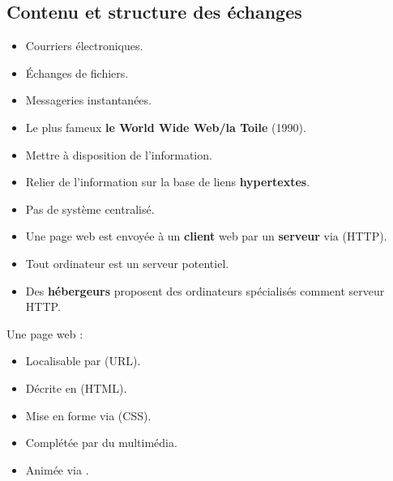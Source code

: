 \subsection{Contenu et structure des échanges} 

\begin{slide}
	\begin{itemize}
		\item Courriers électroniques.
		\item Échanges de fichiers.
		\item Messageries instantanées.
		\item Le plus fameux \textbf{le World Wide Web/la Toile} (1990).
	\end{itemize}
\end{slide}


\begin{slide}
	\begin{itemize}
		\item Mettre à disposition de l'information.
		\item Relier de l'information sur la base de liens \textbf{hypertextes}.
		\item Pas de système centralisé.
	\end{itemize}
\end{slide}

\begin{slide}
	\begin{itemize}
		\item Une page web est envoyée à un \textbf{client} web par un \textbf{serveur} via  (HTTP).
		\item Tout ordinateur est un serveur potentiel.
		\item Des \textbf{hébergeurs} proposent des  ordinateurs spécialisés comment serveur HTTP.
	\end{itemize}
\end{slide}

\begin{slide}
	Une page web :
	\begin{itemize}
		\item Localisable par  (URL).
		\item Décrite en  (HTML).
		\item Mise en forme via  (CSS).
		\item Complétée par du multimédia.
		\item Animée via . %
	\end{itemize}

\end{slide}

